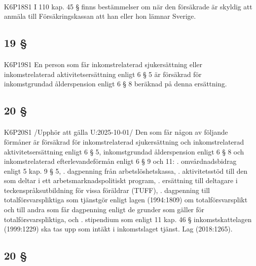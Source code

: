 \documentclass[a4paper,notitlepage,openany,10pt]{book}
\begin{document}
\paragraph*{}
{\tiny K6P18S1}
I 110 kap. 45 § finns bestämmelser om när den försäkrade är skyldig att anmäla till Försäkringskassan att han eller hon lämnar Sverige.
\subsection*{19 §}
\paragraph*{}
{\tiny K6P19S1}
En person som får inkomstrelaterad sjukersättning eller inkomstrelaterad aktivitetsersättning enligt 6 § 5 är försäkrad för inkomstgrundad ålderspension enligt 6 § 8 beräknad på denna ersättning.
\subsection*{20 §}
\paragraph*{}
{\tiny K6P20S1}
/Upphör att gälla U:2025-10-01/
Den som får någon av följande förmåner är försäkrad för inkomstrelaterad sjukersättning och inkomstrelaterad aktivitetsersättning enligt 6 § 5, inkomstgrundad ålderspension enligt 6 § 8 och inkomstrelaterad efterlevandeförmån enligt 6 § 9 och 11:
. omvårdnadsbidrag enligt 5 kap. 9 § 5,
. dagpenning från arbetslöshetskassa,
. aktivitetsstöd till den som deltar i ett arbetsmarknadspolitiskt program,
. ersättning till deltagare i teckenspråksutbildning för vissa föräldrar (TUFF),
. dagpenning till totalförsvarspliktiga som tjänstgör enligt lagen (1994:1809) om totalförsvarsplikt och till andra som får dagpenning enligt de grunder som gäller för totalförsvarspliktiga, och
. stipendium som enligt 11 kap. 46 § inkomstskattelagen (1999:1229) ska tas upp som intäkt i inkomstslaget tjänst.
Lag (2018:1265).
\subsection*{20 §}
\end{document}
